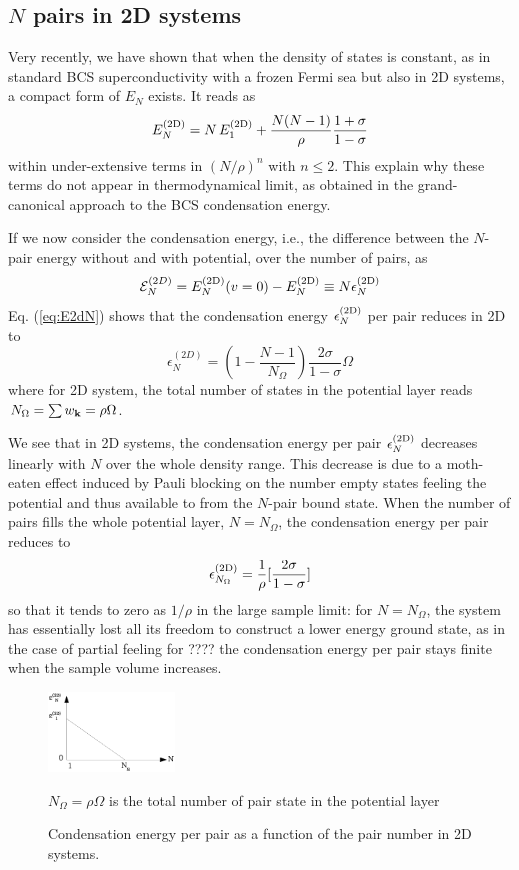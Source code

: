 \documentclass[3p,twocolumn]{elsarticle}
\begin{document}
\subsection{$N$ pairs in 2D systems}
Very recently, we have shown that when the density of states is constant, as in standard BCS superconductivity with a frozen Fermi sea but also in 2D systems, a compact form of $E_N$ exists. It  reads as  
\begin{equation}\label{eq:E2dN}
 E^{{\text{(2D)}}}_N=N\,E^{{\text{(2D)}}}_1+\frac{N(N-1)}{\rho}\frac{1+\sigma}{1-\sigma}
\end{equation}
within under-extensive terms in $(N/\rho)^n$ with $n\leq2$. This explain why these terms do not appear in thermodynamical limit, as obtained in the grand-canonical approach to the BCS condensation energy. 

If we now consider the condensation energy, i.e., the difference between the $N$-pair energy without and with potential, over the number of pairs, as 
\begin{equation}
 \mathcal{E}^{(2D)}_N=E_N^{{{\text{(2D)}}}}(v=0)-E_N^{{\text{(2D)}}}\equiv{}N\epsilon_N^{{\text{(2D)}}}
 \end{equation}
 Eq. (\ref{eq:E2dN}) shows that the condensation energy $\epsilon_{N}^{{{\text{(2D)}}}}$ per pair reduces in 2D to
 \begin{equation}
\epsilon^{(2D)}_N=(1-\frac{N-1}{N_\Omega})\frac{2\sigma}{1-\sigma}\Omega\label{eq:E2D}
\end{equation}
where for 2D system, the total number of states in the potential layer reads $N_\Omega=\sum{}w_{\mathbf{k}}=\rho\Omega$. 

We see that in 2D systems, the condensation energy per pair $\epsilon^{{\text{(2D)}}}_N$  decreases linearly with $N$ over the whole density range. This decrease is due to a moth-eaten effect induced by Pauli blocking on the number empty states feeling the potential and thus available to from the $N$-pair bound state.  When the number of pairs fills the whole potential layer, $N=N_\Omega$, the condensation energy per pair reduces to 
\begin{equation}
 \epsilon^{{\text{(2D)}}}_{N_\Omega}=\frac{1}{\rho}[\frac{2\sigma}{1-\sigma}]
\end{equation}
so that it tends to zero as $1/\rho$ in the large sample limit: for $N=N_\Omega$, the system has  essentially lost all its freedom to construct a lower energy ground state, as in the case of partial feeling for ???? the condensation energy per pair stays finite when the sample volume increases.  


\begin{figure}[htbp]
	\centering
		\includegraphics[width=0.30\textwidth]{2dCondEnergy.eps}
	\caption{Condensation energy per pair as a function of the pair number in 2D systems.}
	$N_{\Omega}=\rho\Omega$ is the total number of pair state in the potential layer
	\label{fig:2dCondEnergy}
\end{figure}
\end{document}
